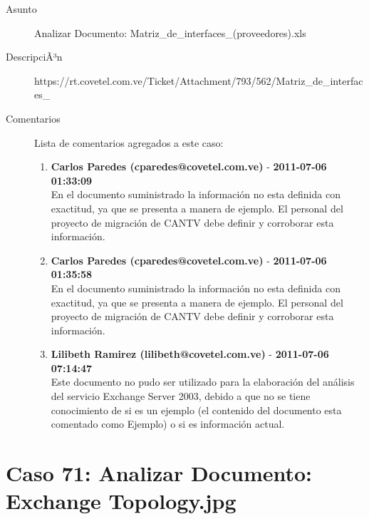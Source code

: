 \begin{description}

\item[Asunto] Analizar Documento: Matriz_de_interfaces_(proveedores).xls\item[DescripciÃ³n] https://rt.covetel.com.ve/Ticket/Attachment/793/562/Matriz_de_interfaces_%

\item[Comentarios] Lista de comentarios agregados a este caso:  
\begin{enumerate}
        \item {\bfseries Carlos Paredes (cparedes@covetel.com.ve)  } - {\bfseries 2011-07-06 01:33:09} \\ En el documento suministrado la información no esta definida con exactitud, ya
que se presenta a manera de ejemplo. El personal del proyecto de migración de
CANTV debe definir y corroborar esta información.        \item {\bfseries Carlos Paredes (cparedes@covetel.com.ve)  } - {\bfseries 2011-07-06 01:35:58} \\ En el documento suministrado la información no esta definida con exactitud, ya
que se presenta a manera de ejemplo. El personal del proyecto de migración de
CANTV debe definir y corroborar esta información.        \item {\bfseries Lilibeth Ramirez (lilibeth@covetel.com.ve)  } - {\bfseries 2011-07-06 07:14:47} \\ Este documento no pudo ser utilizado para la elaboración del análisis del
servicio Exchange Server 2003, debido a que no se tiene conocimiento de si es
un ejemplo (el contenido del documento esta comentado como Ejemplo) o si es
información actual.    \end{enumerate}

\end{description}

\section{Caso 71: Analizar Documento: Exchange Topology.jpg  }

